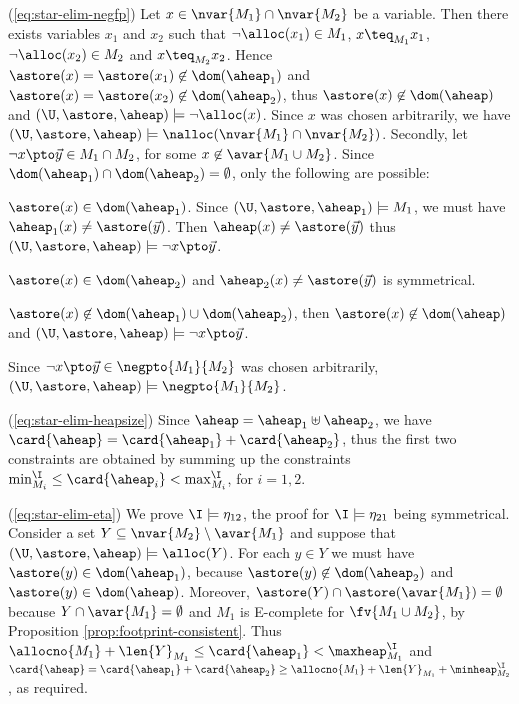 {  (\ref{eq:star-elim-negfp}) Let $x \in \nvar{M_1} \cap \nvar{M_2}$ be
  a variable. Then there exists variables $x_1$ and $x_2$ such that
  $\neg\alloc(x_1) \in M_1$, $x \teq_{M_1} x_1$, $\neg\alloc(x_2) \in
  M_2$ and $x \teq_{M_2} x_2$. Hence $\astore(x) = \astore(x_1)
  \not\in \dom(\aheap_1)$ and $\astore(x) = \astore(x_2) \not\in
  \dom(\aheap_2)$, thus $\astore(x) \not\in \dom(\aheap)$ and
  $(\U,\astore,\aheap) \models \neg\alloc(x)$. Since $x$ was chosen
  arbitrarily, we have $(\U,\astore,\aheap) \models \nalloc(\nvar{M_1}
  \cap \nvar{M_2})$. Secondly, let $\neg x \pto \vec{y} \in M_1 \cap
  M_2$, for some $x \not\in \avar{M_1 \cup M_2}$. Since
  $\dom(\aheap_1) \cap \dom(\aheap_2) = \emptyset$, only the following
  are possible: \begin{compactenum}
  \item $\astore(x) \in \dom(\aheap_1)$. Since $(\U,\astore,\aheap_1)
    \models M_1$, we must have $\aheap_1(x) \neq
    \astore(\vec{y})$. Then $\aheap(x) \neq \astore(\vec{y})$ thus
    $(\U,\astore,\aheap) \models \neg x \pto \vec{y}$.
  \item $\astore(x) \in \dom(\aheap_2)$ and $\aheap_2(x) \neq
    \astore(\vec{y})$ is symmetrical.
  \item $\astore(x) \not\in \dom(\aheap_1) \cup \dom(\aheap_2)$, then
    $\astore(x) \not\in \dom(\aheap)$ and $(\U,\astore,\aheap) \models
    \neg x \pto \vec{y}$.
  \end{compactenum}
  Since $\neg x \pto \vec{y} \in \negpto{M_1}{M_2}$ was chosen
  arbitrarily, $(\U,\astore,\aheap) \models \negpto{M_1}{M_2}$.

  (\ref{eq:star-elim-heapsize}) Since $\aheap = \aheap_1 \uplus
  \aheap_2$, we have $\card{\aheap} = \card{\aheap_1} + \card{\aheap_2}$,
  thus the first two constraints are obtained by summing up the
  constraints $\min^\I_{M_i} \leq \card{\aheap_i} < \max^\I_{M_i}$, for
  $i=1,2$. 

  (\ref{eq:star-elim-eta}) We prove $\I \models \eta_{12}$, the proof
  for $\I \models \eta_{21}$ being symmetrical. Consider a set $Y
  \subseteq \nvar{M_2} \setminus \avar{M_1}$ and suppose that
  $(\U,\astore,\aheap) \models \alloc(Y)$. For each $y \in Y$ we must
  have $\astore(y) \in \dom(\aheap_1)$, because $\astore(y) \not\in
  \dom(\aheap_2)$ and $\astore(y) \in \dom(\aheap)$.  Moreover,
  $\astore(Y) \cap \astore(\avar{M_1}) = \emptyset$ because $Y \cap
  \avar{M_1} = \emptyset$ and $M_1$ is E-complete for $\fv{M_1 \cup
    M_2}$, by Proposition \ref{prop:footprint-consistent}. Thus
  $\allocno{M_1} + \len{Y}_{M_1} \leq \card{\aheap_1} <
  \maxheap^\I_{M_1}$ and $\card{\aheap} = \card{\aheap_1} +
  \card{\aheap_2} \geq \allocno{M_1} + \len{Y}_{M_1} +
  \minheap^\I_{M_2}$, as required.
 
}
